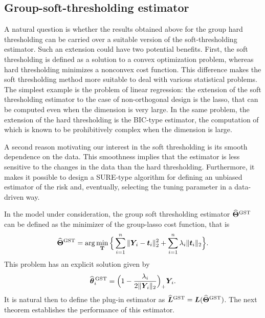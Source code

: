 \documentclass[sts,preprint,reqno,a4paper]{imsart}
\def\l{\lambda}
\def\bt{\boldsymbol\theta}
\def\bY{\boldsymbol Y\!}
\def\bL{\boldsymbol L}
\def\bfT{\mathbf\Theta}
\def\hat{\widehat}
\theoremstyle{plain}
\theoremstyle{remark}
\theoremstyle{definition}
\begin{document}
\subsection{Group-soft-thresholding estimator}

A natural question is whether the results obtained above for the group hard
thresholding can be carried over a suitable version of the soft-thresholding
estimator. Such an extension could have two potential benefits. First, the soft
thresholding is defined as a solution to a convex optimization problem, whereas
hard thresholding minimizes a nonconvex cost function. This difference makes
the soft thresholding method more suitable to deal with various statistical
problems. The simplest example is the problem of linear regression: the extension
of the soft thresholding estimator to the case of non-orthogonal design is the lasso,
that can be computed even when the dimension is very large. In the same problem,
the extension of the hard thresholding is the BIC-type estimator, the computation
of which is known to be prohibitively complex when the dimension is large.

A second reason motivating our interest in the soft thresholding is its smooth
dependence on the data. This smoothness implies that the estimator is less sensitive to the changes in the data than the hard thresholding. Furthermore, it makes it
possible to design a SURE-type algorithm for defining an unbiased estimator of the
risk and, eventually, selecting the tuning parameter in a data-driven way.

In the model under consideration, the group soft thresholding estimator 
$\hat{\bfT}^{\rm GST}$
can be defined as the minimizer of the group-lasso cost function, that is
\begin{equation}\label{definition_ST}
	\hat{\bfT}^{\rm GST} = \arg\min_{\mathbf{T}}
	\Big\{ \sum_{i=1}^n \| \bY_i - \boldsymbol{t}_i \|_2^2 + \sum_{i=1}^n \l_i \|\boldsymbol{t}_i\|_2 \Big\}.
\end{equation}
This problem has an explicit solution given by
\begin{equation}\label{definition_STexplicite}
	\hat{\bt}{}^{\,\rm GST}_i = \Big(1-\frac{\l_i}{2\|\bY_i\|_2}\Big)_+ \bY_i.
\end{equation}
It is natural then to define the plug-in estimator as
$\hat{\bL}{}^{\rm GST} = \bL(\hat{\bfT}^{\rm GST})$. The next theorem establishes
the performance of this estimator.
\end{document}
